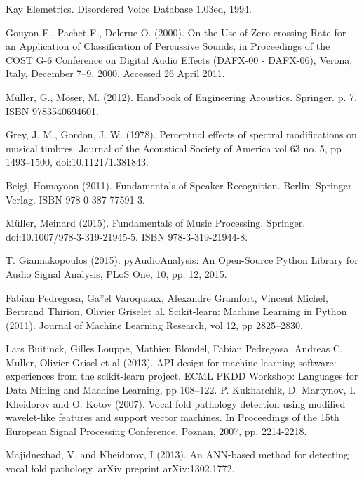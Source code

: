\documentclass[conference]{IEEEtran}
\begin{document}
\begin{thebibliography}{00}
Kay Elemetrics. Disordered Voice Database 1.03ed, 1994.	

 Gouyon F., Pachet F., Delerue O. (2000). On the Use of Zero-crossing Rate for an Application of Classification of Percussive Sounds, in Proceedings of the COST G-6 Conference on Digital Audio Effects (DAFX-00 - DAFX-06), Verona, Italy, December 7–9, 2000. Accessed 26 April 2011.

Müller, G., Möser, M. (2012). Handbook of Engineering Acoustics. Springer. p. 7. ISBN 9783540694601.

Grey, J. M., Gordon, J. W. (1978). Perceptual effects of spectral modifications on musical timbres. Journal of the Acoustical Society of America vol 63 no. 5, pp 1493–1500, doi:10.1121/1.381843.

Beigi, Homayoon (2011). Fundamentals of Speaker Recognition. Berlin: Springer-Verlag. ISBN 978-0-387-77591-3.

Müller, Meinard (2015). Fundamentals of Music Processing. Springer. doi:10.1007/978-3-319-21945-5. ISBN 978-3-319-21944-8.

T. Giannakopoulos (2015). pyAudioAnalysis: An Open-Source Python Library for Audio Signal Analysis, PLoS One, 10, pp. 12, 2015.

Fabian Pedregosa, Ga''el Varoquaux, Alexandre Gramfort, Vincent Michel, Bertrand Thirion, Olivier Griselet al. Scikit-learn: Machine Learning in Python (2011). Journal of Machine Learning Research, vol 12, pp 2825--2830.

Lars Buitinck, Gilles Louppe, Mathieu Blondel, Fabian Pedregosa, Andreas C. Muller, Olivier Grisel et al (2013). API design for machine learning software: experiences from the scikit-learn project. ECML PKDD Workshop: Languages for Data Mining and Machine Learning, pp 108--122.
P. Kukharchik, D. Martynov, I. Kheidorov and O. Kotov (2007). Vocal fold pathology detection using modified wavelet-like features and support vector machines. In Proceedings of the 15th European Signal Processing Conference, Poznan, 2007, pp. 2214-2218.

Majidnezhad, V. and Kheidorov, I (2013). An ANN-based method for detecting vocal fold pathology. arXiv preprint arXiv:1302.1772.


\end{thebibliography}
\end{document}
